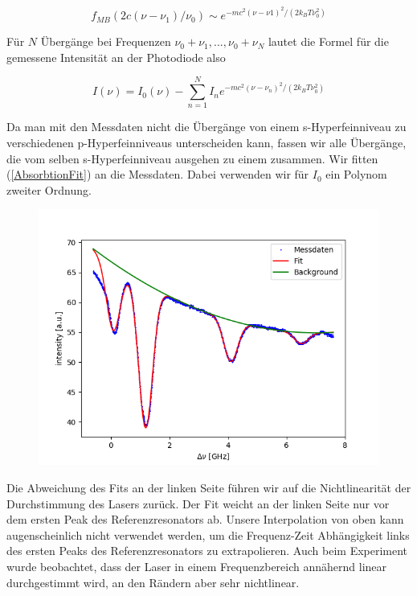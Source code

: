\documentclass[a4paper,parskip]{scrartcl}
\begin{document}
$$f_{MB}(2c(\nu-\nu_1)/\nu_0) \sim e^{-mc^2(\nu-\nu1)^2/(2k_BT\nu_0^2)}$$

Für $N$ Übergänge bei Frequenzen $\nu_0+\nu_1,...,\nu_0+\nu_N$ lautet die Formel für die gemessene Intensität an der Photodiode also

\begin{equation}
I(\nu) = I_0(\nu) - \sum_{n=1}^N I_n e^{-mc^2(\nu-\nu_n)^2/(2k_BT\nu_0^2)}
\label{AbsorbtionFit}
\end{equation}

Da man mit den Messdaten nicht die Übergänge von einem s-Hyperfeinniveau zu verschiedenen p-Hyperfeinniveaus unterscheiden kann, fassen wir alle Übergänge, die vom selben s-Hyperfeinniveau ausgehen zu einem zusammen. Wir fitten (\ref{AbsorbtionFit}) an die Messdaten. Dabei verwenden wir für $I_0$ ein Polynom zweiter Ordnung.

\begin{figure}[h]
\includegraphics[scale = 0.5]{./absorbtion/fit.png}
\end{figure}

Die Abweichung des Fits an der linken Seite führen wir auf die Nichtlinearität der Durchstimmung des Lasers zurück. Der Fit weicht an der linken Seite nur vor dem ersten Peak des Referenzresonators ab. Unsere Interpolation von oben kann augenscheinlich nicht verwendet werden, um die Frequenz-Zeit Abhängigkeit links des ersten Peaks des Referenzresonators zu extrapolieren. Auch beim Experiment wurde beobachtet, dass der Laser in einem Frequenzbereich annähernd linear durchgestimmt wird, an den Rändern aber sehr nichtlinear.
\end{document}
